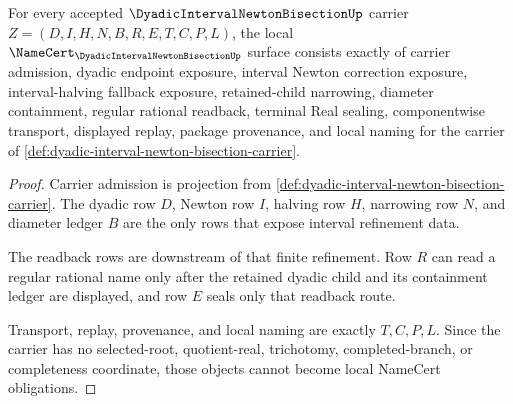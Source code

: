 \begin{theorem}
\label{thm:dyadic-interval-newton-bisection-namecert-obligations}
For every accepted $\DyadicIntervalNewtonBisectionUp$ carrier $Z=(D,I,H,N,B,R,E,T,C,P,L)$, the local $\NameCert_{\DyadicIntervalNewtonBisectionUp}$ surface consists exactly of carrier admission, dyadic endpoint exposure, interval Newton correction exposure, interval-halving fallback exposure, retained-child narrowing, diameter containment, regular rational readback, terminal Real sealing, componentwise transport, displayed replay, package provenance, and local naming for the carrier of \autoref{def:dyadic-interval-newton-bisection-carrier}.
\end{theorem}
\begin{proof}
Carrier admission is projection from \autoref{def:dyadic-interval-newton-bisection-carrier}. The dyadic row $D$, Newton row $I$, halving row $H$, narrowing row $N$, and diameter ledger $B$ are the only rows that expose interval refinement data.

The readback rows are downstream of that finite refinement. Row $R$ can read a regular rational name only after the retained dyadic child and its containment ledger are displayed, and row $E$ seals only that readback route.

Transport, replay, provenance, and local naming are exactly $T,C,P,L$. Since the carrier has no selected-root, quotient-real, trichotomy, completed-branch, or completeness coordinate, those objects cannot become local NameCert obligations.
\end{proof}

